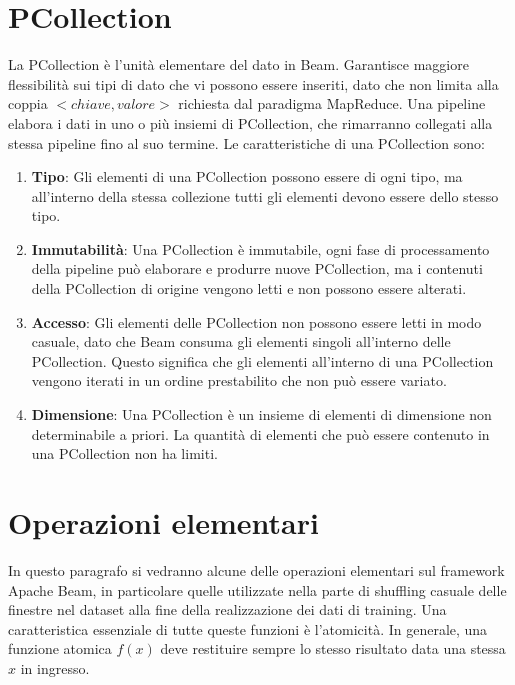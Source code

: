 \section{PCollection}
La PCollection è l’unità elementare del dato in Beam. Garantisce maggiore flessibilità sui tipi di dato che vi possono essere inseriti, dato che non limita alla coppia $ <chiave, valore> $ richiesta dal paradigma MapReduce. Una pipeline elabora i dati in uno o più insiemi di PCollection, che rimarranno collegati alla stessa pipeline fino al suo termine. Le caratteristiche di una PCollection sono:
\begin{enumerate}
\item \textbf{Tipo}: Gli elementi di una PCollection possono essere di ogni tipo, ma all'interno della stessa collezione tutti gli elementi devono essere dello stesso tipo.
\item \textbf{Immutabilità}: Una PCollection è immutabile, ogni fase di processamento della pipeline può elaborare e produrre nuove PCollection, ma i contenuti della PCollection di origine vengono letti e non possono essere alterati.
\item \textbf{Accesso}: Gli elementi delle PCollection non possono essere letti in modo casuale, dato che Beam consuma gli elementi singoli all’interno delle PCollection. Questo significa che gli elementi all'interno di una PCollection vengono iterati in un ordine prestabilito che non può essere variato.
\item \textbf{Dimensione}: Una PCollection è un insieme di elementi di dimensione non determinabile a priori. La quantità di elementi che può essere contenuto in una PCollection non ha limiti.
\end{enumerate}
\section{Operazioni elementari}\label{beamoperations}
In questo paragrafo si vedranno alcune delle operazioni elementari sul framework Apache Beam, in particolare quelle utilizzate nella parte di shuffling casuale delle finestre nel dataset alla fine della realizzazione dei dati di training. Una caratteristica essenziale di tutte queste funzioni è l’atomicità.  In generale, una funzione atomica $ f(x) $ deve restituire sempre lo stesso risultato data una stessa $x$ in ingresso.
